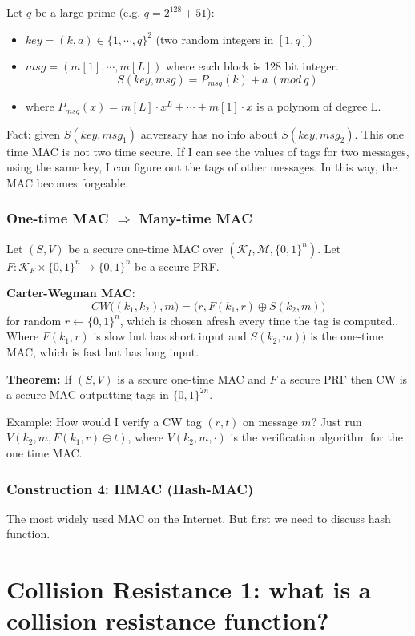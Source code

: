 \documentclass[12pt]{book}
\newcommand{\Thm}{\textbf{Theorem:} }
\begin{document}
Let $q$ be a large prime (e.g. $q=2^{128}+51$):
\begin{itemize}
	\item[] $key = (k,a)\in\{1,\cdots,q\}^{2}$ (two random integers in $[1,q]$)
	\item[] $msg = (m[1],\cdots,m[L])$ where each block is 128 bit integer.
	$$S(key,msg)=P_{msg}(k)+a\ (mod\ q)$$
	\item[] where $P_{msg}(x)=m[L]\cdot x^{L}+\cdots + m[1]\cdot x$ is a polynom of degree L.
\end{itemize}
Fact: given $S(key, msg_{1})$ adversary has no info about $S(key, msg_{2})$. This one time MAC is not two time secure. If I can see the values of tags for two messages, using the same key, I can figure out the tags of other messages. In this way, the MAC becomes forgeable.

\subsubsection{One-time MAC $\Rightarrow$ Many-time MAC}
Let $(S,V)$ be a secure one-time MAC over $(\mathcal{K}_{I},\mathcal{M},\{0,1\}^{n})$. Let $F:\mathcal{K}_{F}\times\{0,1\}^{n}\rightarrow\{0,1\}^{n}$ be a secure PRF.

\textbf{Carter-Wegman MAC}: $$CW\big((k_{1},k_{2}),m\big)=\big(r,F(k_{1},r)\oplus S(k_{2},m)\big)$$for random $r\leftarrow\{0,1\}^{n}$, which is chosen afresh every time the tag is computed.. Where $F(k_{1},r)$ is slow but has short input and $S(k_{2},m)\big)$ is the one-time MAC, which is fast but has long input.

\Thm If $(S,V)$ is a secure one-time MAC and $F$ a secure PRF then CW is a secure MAC outputting tags in $\{0,1\}^{2n}$.

Example: How would I verify a CW tag $(r,t)$ on message $m$? Just run $V(k_{2},m,F(k_{1},r)\oplus t)$, where $V(k_{2},m,\cdot)$ is the verification algorithm for the one time MAC.

\subsubsection{Construction 4: HMAC (Hash-MAC)}
The most widely used MAC on the Internet. But first we need to discuss hash function.

\newpage
\section{Collision Resistance 1: what is a collision resistance function?}
\end{document}
